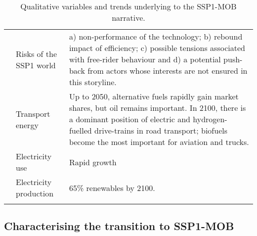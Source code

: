 {\begin{longtable}{p{3cm}p{3.5cm}p{8cm}}
\textit{} & Risks of the SSP1 world & a) non-performance of the technology; b) rebound impact of efficiency; c) possible tensions associated with free-rider behaviour and d) a potential push-back from actors whose interests are not ensured in this storyline.\\
\textit{} & Transport energy & Up to 2050, alternative fuels rapidly gain market shares, but oil remains important. In 2100, there is a dominant position of electric and hydrogen-fuelled drive-trains in road transport; biofuels become the most important for aviation and trucks.\\
\textit{} & Electricity use & Rapid growth\\
\textit{} & Electricity production & 65\% renewables by 2100.\\ \bottomrule
\caption{Qualitative variables and trends underlying to the \gls{SSP1-MOB} narrative.}
\label{t:ssp1-mob-narrative-vars}
\end{longtable}
}

\subsection{Characterising the transition to SSP1-MOB}
\label{ss:results:ssp1-mob-transition-char}